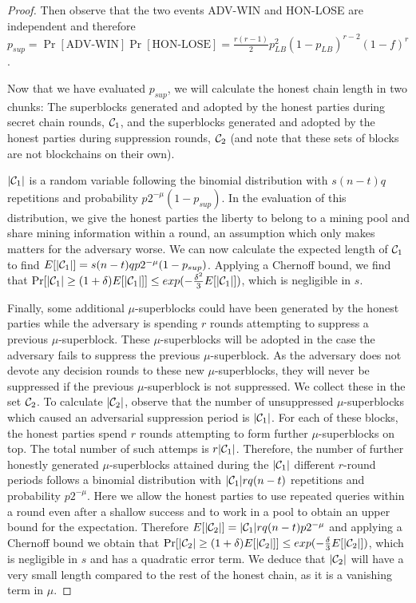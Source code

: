 \begin{proof}
Then observe that the two events ADV-WIN and HON-LOSE are independent and
therefore
$p_{sup} =
 \Pr[\text{ADV-WIN}]\Pr[\text{HON-LOSE}] =
 \frac{r(r - 1)}{2} p_{LB}^2 (1 - p_{LB})^{r - 2}(1 - f)^r$.

Now that we have evaluated $p_{sup}$,  we will calculate the honest chain length
in two chunks: The superblocks generated and adopted by the honest parties
during secret chain rounds, $\mathcal{C}_1$, and the superblocks generated and
adopted by the honest parties during suppression rounds, $\mathcal{C}_2$ (and note
that these sets of blocks are not blockchains on their own).

$|\mathcal{C}_1|$ is a random variable following the binomial distribution with
$s(n - t)q$ repetitions and probability $p2^{-\mu}(1 - p_{sup})$. In the
evaluation of this distribution, we give the honest parties the liberty to
belong to a mining pool and share mining information within a round, an
assumption which only makes matters for the adversary worse. We can now
calculate the expected length of $\mathcal{C}_1$ to find
$E[|\mathcal{C}_1|] = s(n - t)qp2^{-\mu}(1 - p_{sup})$. Applying a Chernoff bound, we
find that
$\Pr[|\mathcal{C}_1| \geq (1 + \delta)E[|\mathcal{C}_1|]]
\leq exp(-\frac{\delta^2}{3}E[|\mathcal{C}_1|])$, which is negligible in $s$.

Finally, some additional $\mu$-superblocks could have been generated by the
honest parties while the adversary is spending $r$ rounds attempting to suppress
a previous $\mu$-superblock. These $\mu$-superblocks will be adopted in the case
the adversary fails to suppress the previous $\mu$-superblock. As the adversary
does not devote any decision rounds to these new $\mu$-superblocks, they will
never be suppressed if the previous $\mu$-superblock is not suppressed. We
collect these in the set $\mathcal{C}_2$. To calculate $|\mathcal{C}_2|$, observe that the
number of unsuppressed $\mu$-superblocks which caused an adversarial suppression
period is $|\mathcal{C}_1|$. For each of these blocks, the honest parties spend $r$
rounds attempting to form further $\mu$-superblocks on top. The total number of
such attemps is $r|\mathcal{C}_1|$. Therefore, the number of further honestly
generated $\mu$-superblocks attained during the $|\mathcal{C}_1|$ different $r$-round
periods follows a binomial distribution with $|\mathcal{C}_1|rq(n - t)$ repetitions
and probability $p2^{-\mu}$. Here we allow the honest parties to use repeated
queries within a round even after a shallow success and to work in a pool
to obtain an upper bound for the expectation. Therefore $E[|\mathcal{C}_2|] =
|\mathcal{C}_1|rq(n - t)p2^{-\mu}$ and applying a Chernoff bound we obtain that
$\Pr[|\mathcal{C}_2| \geq (1 + \delta)E[|\mathcal{C}_2|]] \leq
exp(-\frac{\delta}{3}E[|\mathcal{C}_2|])$, which is negligible in $s$ and has a
quadratic error term. We deduce that $|\mathcal{C}_2|$ will have a very small length
compared to the rest of the honest chain, as it is a vanishing term in $\mu$.


\end{proof}
